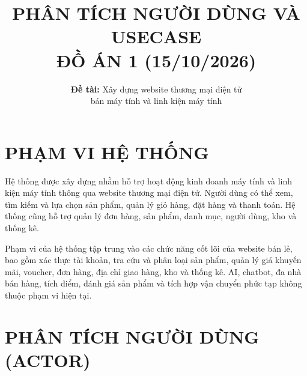 \documentclass[12pt,a4paper]{article}
\title{\textbf{PHÂN TÍCH NGƯỜI DÙNG VÀ USECASE}\\
\Large ĐỒ ÁN 1 (15/10/2026)}
\author{\textbf{Đề tài:} Xây dựng website thương mại điện tử\\
bán máy tính và linh kiện máy tính}
\date{}
\begin{document}
\maketitle
\section{PHẠM VI HỆ THỐNG}

Hệ thống được xây dựng nhằm hỗ trợ hoạt động kinh doanh máy tính và linh kiện máy tính thông qua website thương mại điện tử. Người dùng có thể xem, tìm kiếm và lựa chọn sản phẩm, quản lý giỏ hàng, đặt hàng và thanh toán. Hệ thống cũng hỗ trợ quản lý đơn hàng, sản phẩm, danh mục, người dùng, kho và thống kê.

Phạm vi của hệ thống tập trung vào các chức năng cốt lõi của website bán lẻ, bao gồm xác thực tài khoản, tra cứu và phân loại sản phẩm, quản lý giá khuyến mãi, voucher, đơn hàng, địa chỉ giao hàng, kho và thống kê. AI, chatbot, đa nhà bán hàng, tích điểm, đánh giá sản phẩm và tích hợp vận chuyển phức tạp không thuộc phạm vi hiện tại.

\section{PHÂN TÍCH NGƯỜI DÙNG (ACTOR)}
\end{document}
